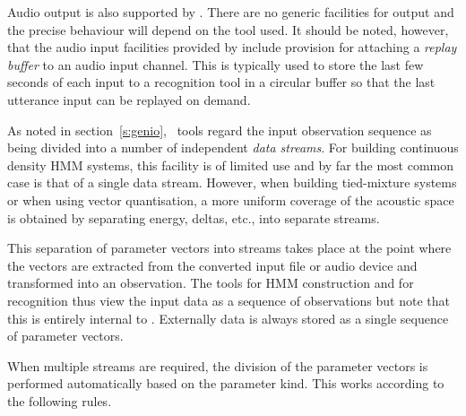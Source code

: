Audio output is also supported by \HTK. There are no
generic facilities for output and the precise behaviour will depend on the tool
used. It should be noted, however, that the audio input facilities provided by
 include provision for attaching a \textit{replay buffer} to an
audio input channel.  This is typically used to store the last few seconds of
each input to a recognition tool in a circular buffer so that the last
utterance input can be replayed on demand.



As noted in section~\ref{s:genio}, \HTK\ tools regard the input observation
sequence as being divided into a number of independent \textit{data streams}.
For building continuous density HMM systems, this facility is of limited
use and by far the most common case is that of a single data stream.
However, when building tied-mixture systems or when
using vector quantisation, a more uniform coverage of the
acoustic space is obtained by separating energy, deltas, etc., into
separate streams.

This separation of parameter vectors into streams takes place at 
the point where the vectors
are extracted from the converted input file or audio device and
transformed into an observation.  The tools for HMM construction
and for recognition thus view the input data as a sequence of observations
but note that this is entirely internal to \HTK.   Externally data is
always stored as a single sequence of parameter vectors.

When multiple streams are required,
the division of the parameter vectors is performed automatically
based on the parameter kind.  This works according 
to the following rules.  

